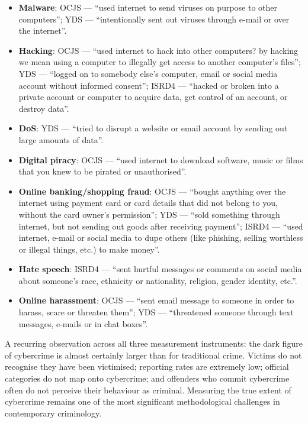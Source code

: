 \documentclass[11pt,a4paper,openany]{report}
\theoremstyle{definition}
\theoremstyle{plain}
\theoremstyle{remark}
\begin{document}
\begin{itemize}
    \item \textbf{Malware}: OCJS --- ``used internet to send viruses on purpose to other computers''; YDS --- ``intentionally sent out viruses through e-mail or over the internet''.
    \item \textbf{Hacking}: OCJS --- ``used internet to hack into other computers? by hacking we mean using a computer to illegally get access to another computer's files''; YDS --- ``logged on to somebody else's computer, email or social media account without informed consent''; ISRD4 --- ``hacked or broken into a private account or computer to acquire data, get control of an account, or destroy data''.
    \item \textbf{DoS}: YDS --- ``tried to disrupt a website or email account by sending out large amounts of data''.
    \item \textbf{Digital piracy}: OCJS --- ``used internet to download software, music or films that you knew to be pirated or unauthorised''.
    \item \textbf{Online banking/shopping fraud}: OCJS --- ``bought anything over the internet using payment card or card details that did not belong to you, without the card owner's permission''; YDS --- ``sold something through internet, but not sending out goods after receiving payment''; ISRD4 --- ``used internet, e-mail or social media to dupe others (like phishing, selling worthless or illegal things, etc.) to make money''.
    \item \textbf{Hate speech}: ISRD4 --- ``sent hurtful messages or comments on social media about someone's race, ethnicity or nationality, religion, gender identity, etc.''.
    \item \textbf{Online harassment}: OCJS --- ``sent email message to someone in order to harass, scare or threaten them''; YDS --- ``threatened someone through text messages, e-mails or in chat boxes''.
\end{itemize}

\begin{keypoint}
A recurring observation across all three measurement instruments: the dark figure of cybercrime is almost certainly larger than for traditional crime. Victims do not recognise they have been victimised; reporting rates are extremely low; official categories do not map onto cybercrime; and offenders who commit cybercrime often do not perceive their behaviour as criminal. Measuring the true extent of cybercrime remains one of the most significant methodological challenges in contemporary criminology.
\end{keypoint}
\end{document}
